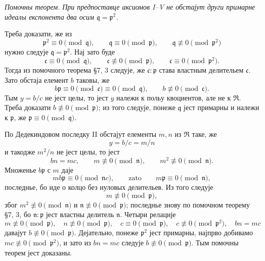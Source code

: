 \documentclass[11pt]{article}
\providecommand{\mR}{\mathfrak{R}}
\providecommand{\mc}{\mathfrak{c}}
\providecommand{\mn}{\mathfrak{n}}
\providecommand{\mq}{\mathfrak{q}}
\providecommand{\mpideal}{\mathfrak{p}}
\begin{document}
\emph{Помочны теорем.} \emph{При предпоставце аксиомов I--V не обстајут други примарне идеалы експонента два осим $\mq=\mpideal^2$.}

Треба доказати, же из
\[
        \mpideal^2\equiv0\pmod{\mq},
        \qquad \mq\equiv0\pmod{\mpideal},
        \qquad \mq\not\equiv0\pmod{\mpideal^2}
\]
нужно следује $\mq=\mpideal^2$. Нај зато буде
\[
        \mc\equiv0\pmod{\mq},
        \qquad \mc\not\equiv0\pmod{\mpideal},
        \qquad \mc\equiv0\pmod{\mpideal^2}.
\]
Тогда из помочного теорема §7, 3 следује, же $\mc:\mpideal$ става властным делительем $\mc$. Зато обстаја елемент $b$ таковы, же
\[
        b\mpideal\equiv0\pmod{\mc}\equiv0\pmod{\mq},
        \qquad b\not\equiv0\pmod{\mc}.
\]
Тым $y=b/c$ не јест целы, то јест $y$ належи к польу квоциентов, але не к $\mR$. Треба доказати $b\not\equiv0\pmod{\mpideal}$; из того следује, понеже $\mq$ јест примарны и належи к $\mpideal$, же $\mpideal\equiv0\pmod{\mq}$.

По Дедекиндовом последку II обстајут елементы $m,n$ из $\mR$ таке, же
\[
        y=b/c=m/n
\]
и такодже $m^2/n$ не јест целы, то јест
\[
        bn=mc,
        \qquad m\not\equiv0\pmod{\mn},
        \qquad m^2\not\equiv0\pmod{\mn}.
\]
Множенье $b\mpideal$ с $m$ даје
\[
        mb\mpideal\equiv0\pmod{\mn c},
        \qquad\text{zato}\qquad m\mpideal\equiv0\pmod{\mn},
\]
последнье, бо иде о колцо без нуловых делительев. Из того следује
\[
        m\not\equiv0\pmod{\mpideal},
\]
због $m^2\not\equiv0\pmod{\mn}$ и $\mn\not\equiv0\pmod{\mpideal}$; последнье знову по помочном теорему §7, 3, бо $\mn:\mpideal$ јест властны делитель $\mn$. Четыри релације
\[
        m\not\equiv0\pmod{\mpideal},
        \quad n\not\equiv0\pmod{\mpideal},
        \quad c\equiv0\pmod{\mpideal},
        \quad c\not\equiv0\pmod{\mpideal^2},
        \quad bn=mc
\]
давајут $b\not\equiv0\pmod{\mpideal}$. Дејательно, понеже $\mpideal^2$ јест примарны, најпрво добивамо $mc\not\equiv0\pmod{\mpideal^2}$, и зато из $bn=mc$ следује $b\not\equiv0\pmod{\mpideal}$. Тым помочны теорем јест доказаны.
\end{document}

